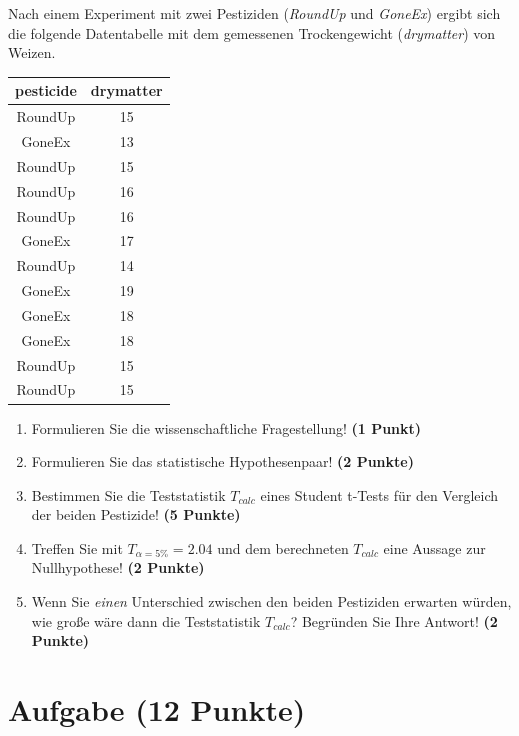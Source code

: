 \documentclass[a4paper, 10pt]{scrartcl}\usepackage[]{graphicx}\usepackage[]{xcolor}
\begin{document}
Nach einem Experiment mit zwei Pestiziden (\textit{RoundUp} und
\textit{GoneEx}) ergibt sich die folgende Datentabelle mit dem gemessenen
Trockengewicht (\textit{drymatter}) von Weizen.

\begin{table}[!h]
\centering
\begin{tabular}{cc}
\toprule
pesticide & drymatter\\
\midrule
RoundUp & 15\\
GoneEx & 13\\
RoundUp & 15\\
RoundUp & 16\\
RoundUp & 16\\
\addlinespace
GoneEx & 17\\
RoundUp & 14\\
GoneEx & 19\\
GoneEx & 18\\
GoneEx & 18\\
\addlinespace
RoundUp & 15\\
RoundUp & 15\\
\bottomrule
\end{tabular}
\end{table}



\begin{enumerate}
  \item Formulieren Sie die wissenschaftliche Fragestellung! \textbf{(1 Punkt)}
  \item Formulieren Sie das statistische Hypothesenpaar! \textbf{(2
      Punkte)}
  \item Bestimmen Sie die Teststatistik $T_{calc}$ eines Student t-Tests f{\"u}r den
  Vergleich der beiden Pestizide! \textbf{(5 Punkte)}
\item Treffen Sie mit $T_{\alpha = 5\%} = 2.04$ und dem berechneten $T_{calc}$ eine Aussage
  zur Nullhypothese! \textbf{(2 Punkte)}
\item Wenn Sie \textit{einen} Unterschied zwischen den beiden
  Pestiziden erwarten w{\"u}rden, wie gro{\ss}e w{\"a}re dann die Teststatistik
  $T_{calc}$? Begr{\"u}nden Sie Ihre Antwort! \textbf{(2 Punkte)}
\end{enumerate} 
\clearpage

\section{Aufgabe \hfill (12 Punkte)}
\end{document}
